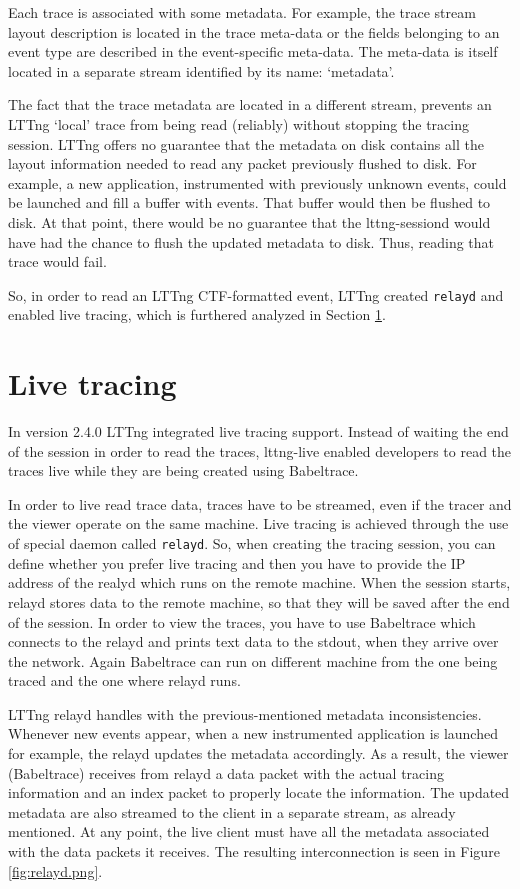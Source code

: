 Each trace is associated with some metadata. For example, the trace stream
layout description is located in the trace meta-data or the fields belonging to
an event type are described in the event-specific meta-data. The meta-data is
itself located in a separate stream identified by its name: `metadata'.


The fact that the trace metadata are located in a different stream, prevents an
LTTng `local' trace from being read (reliably) without stopping the tracing
session. LTTng offers no guarantee that the metadata on disk contains all the
layout information needed to read any packet previously flushed to disk. For
example, a new application, instrumented with previously unknown events, could
be launched and fill a buffer with events. That buffer would then be flushed to
disk. At that point, there would be no guarantee that the lttng-sessiond would
have had the chance to flush the updated metadata to disk. Thus, reading that
trace would fail.

So, in order to read an LTTng CTF-formatted event, LTTng created \texttt{relayd}
and enabled live tracing, which is furthered analyzed in Section
\ref{sec:relayd}.

\section{Live tracing}\label{sec:relayd}

In version 2.4.0 LTTng integrated live tracing support. Instead of waiting the
end of the session in order to read the traces, lttng-live enabled developers to
read the traces live while they are being created using Babeltrace. 

In order to live read trace data, traces have to be streamed, even if the tracer
and the viewer operate on the same machine. Live tracing is achieved through the
use of special daemon called \texttt{relayd}. So, when creating the tracing
session, you can define whether you prefer live tracing and then you have to
provide the IP address of the realyd which runs on the remote machine. When the
session starts, relayd stores data to the remote machine, so that they will be
saved after the end of the session. In order to view the traces, you have to use
Babeltrace which connects to the relayd and prints text data to the stdout, when
they arrive over the network. Again Babeltrace can run on different machine from
the one being traced and the one where relayd runs.

LTTng relayd handles with the previous-mentioned metadata inconsistencies.
Whenever new events appear, when a new instrumented application is launched for
example, the relayd updates the metadata accordingly. As a result, the viewer
(Babeltrace) receives from relayd a data packet with the actual tracing
information and an index packet to properly locate the information. The updated
metadata are also streamed to the client in a separate stream, as already
mentioned. At any point, the live client must have all the metadata associated
with the data packets it receives. The resulting interconnection is seen in
Figure \ref{fig:relayd.png}.

